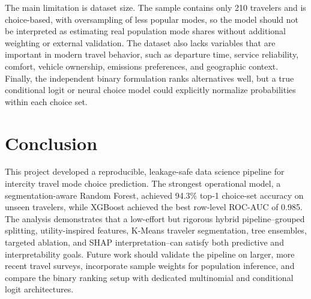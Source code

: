 \documentclass{article}
\begin{document}
The main limitation is dataset size.  The sample contains only 210 travelers and is choice-based, with oversampling of less popular modes, so the model should not be interpreted as estimating real population mode shares without additional weighting or external validation.  The dataset also lacks variables that are important in modern travel behavior, such as departure time, service reliability, comfort, vehicle ownership, emissions preferences, and geographic context.  Finally, the independent binary formulation ranks alternatives well, but a true conditional logit or neural choice model could explicitly normalize probabilities within each choice set.

\section{Conclusion}
This project developed a reproducible, leakage-safe data science pipeline for intercity travel mode choice prediction.  The strongest operational model, a segmentation-aware Random Forest, achieved 94.3\% top-1 choice-set accuracy on unseen travelers, while XGBoost achieved the best row-level ROC-AUC of 0.985.  The analysis demonstrates that a low-effort but rigorous hybrid pipeline--grouped splitting, utility-inspired features, K-Means traveler segmentation, tree ensembles, targeted ablation, and SHAP interpretation--can satisfy both predictive and interpretability goals.  Future work should validate the pipeline on larger, more recent travel surveys, incorporate sample weights for population inference, and compare the binary ranking setup with dedicated multinomial and conditional logit architectures.
\end{document}
